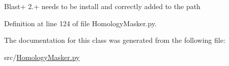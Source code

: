 Blast+ 2.+ needs to be install and correctly added to the path 

Definition at line 124 of file Homology\-Masker.\-py.



The documentation for this class was generated from the following file\-:\begin{DoxyCompactItemize}
\item 
src/\hyperlink{HomologyMasker_8py}{Homology\-Masker.\-py}\end{DoxyCompactItemize}
